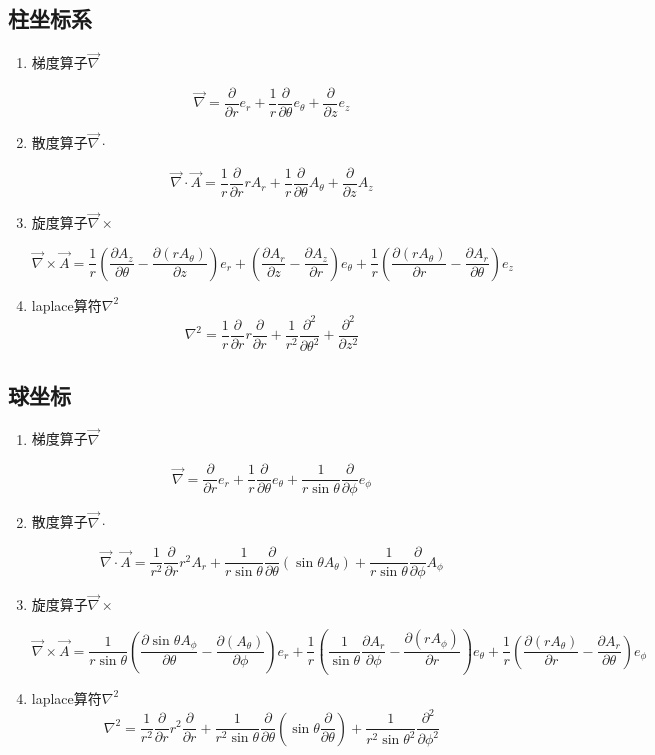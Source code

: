 \subsection{柱坐标系}
\begin{enumerate}
\item{梯度算子$\vec{\nabla}$\par}
\[\vec{\nabla}=\frac{\partial}{\partial r}e_r+\frac{1}{r}\frac{\partial}{\partial \theta}e_\theta+\frac{\partial}{\partial z}e_z\]
\item{散度算子$\vec{\nabla}\cdot$\par}
\[\vec{\nabla}\cdot \vec{A}=\frac{1}{r}\frac{\partial}{\partial r}rA_r+\frac{1}{r}\frac{\partial}{\partial \theta}A_\theta+\frac{\partial}{\partial z}A_z\]
\item{旋度算子$\vec{\nabla}\times$\par}
\[\vec{\nabla}\times \vec{A}=\frac{1}{r}(\frac{\partial A_z}{\partial \theta}-\frac{\partial (rA_\theta)}{\partial z})e_r+(\frac{\partial A_r}{\partial z}-\frac{\partial A_z}{\partial r})e_\theta+\frac{1}{r}(\frac{\partial (rA_\theta)}{\partial r}-\frac{\partial A_r}{\partial \theta})e_z\]
\item{laplace算符$\nabla^2$}
\[\nabla^2=\frac{1}{r}\frac{\partial}{\partial r}r\frac{\partial}{\partial r}+\frac{1}{r^2}\frac{\partial^2}{\partial \theta^2}+\frac{\partial^2}{\partial z^2}\]
\end{enumerate}

\subsection{球坐标}
\begin{enumerate}
\item{梯度算子$\vec{\nabla}$\par}
\[\vec{\nabla}=\frac{\partial}{\partial r}e_r+\frac{1}{r}\frac{\partial}{\partial \theta}e_\theta+\frac{1}{r\sin\theta}\frac{\partial}{\partial \phi}e_\phi\]
\item{散度算子$\vec{\nabla}\cdot$\par}
\[\vec{\nabla}\cdot \vec{A}=\frac{1}{r^2}\frac{\partial}{\partial r}r^2A_r+\frac{1}{r\sin\theta}\frac{\partial}{\partial \theta}(\sin\theta A_\theta)+\frac{1}{r\sin\theta}\frac{\partial}{\partial \phi}A_\phi\]
\item{旋度算子$\vec{\nabla}\times$\par}
\[\vec{\nabla}\times \vec{A}=\frac{1}{r\sin\theta}(\frac{\partial \sin\theta A_\phi}{\partial \theta}-\frac{\partial (A_\theta)}{\partial \phi})e_r+\frac{1}{r}(\frac{1}{\sin\theta}\frac{\partial A_r}{\partial \phi}-\frac{\partial (rA_\phi)}{\partial r})e_\theta+\frac{1}{r}(\frac{\partial (rA_\theta)}{\partial r}-\frac{\partial A_r}{\partial \theta})e_\phi\]
\item{laplace算符$\nabla^2$}
\[\nabla^2=\frac{1}{r^2}\frac{\partial}{\partial r}r^2\frac{\partial}{\partial r}+\frac{1}{r^2\sin\theta}\frac{\partial}{\partial \theta}(\sin\theta\frac{\partial}{\partial \theta})+\frac{1}{r^2\sin\theta^2}\frac{\partial^2}{\partial \phi^2}\]
\end{enumerate}
